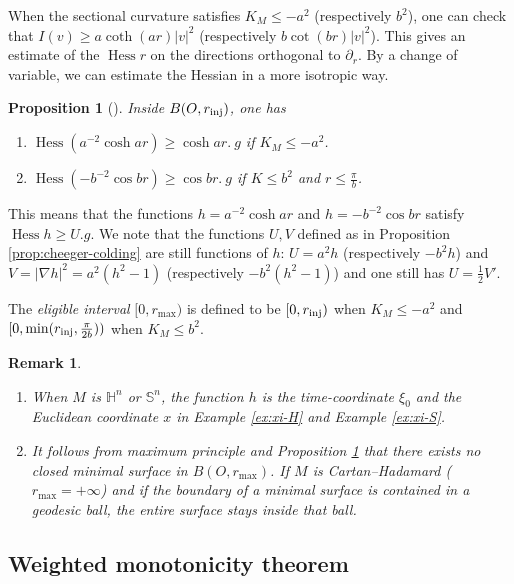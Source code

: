 \documentclass[11pt]{article}
\newtheorem{remark}[theorem]{Remark}
\newtheorem{proposition}[theorem]{Proposition}
\DeclareMathOperator{\hess}{Hess}
\begin{document}
When the sectional curvature
satisfies \(K_M\leq -a^2\) (respectively \(b^2\)), one can check that
\(I(v) \geq a\coth(ar)|v|^2\) (respectively \(b\cot (br)|v|^2\)). This gives an estimate of the \(\hess r\) on the
directions orthogonal to \(\partial_r\). By a change of variable, we can estimate the Hessian in a more isotropic way. 

\begin{proposition}[]
\label{prop:hess-r}
Inside \(B(O,r_{\rm inj})\), one has
\begin{enumerate}
\item \(\hess (a^{-2}\cosh ar) \geq \cosh ar.\ g\) if \(K_M\leq -a^2\).
\item \(\hess (-b^{-2}\cos br) \geq \cos br.\ g\) if \(K\leq b^2\) and \(r\leq \frac{\pi}{b}\).
\end{enumerate}
\end{proposition}
This means that the functions \(h=a^{-2}\cosh ar\) and \(h=-b^{-2}\cos br\) satisfy \(\hess h \geq
U.g\). 
We note that the functions \(U, V\) defined as in Proposition \ref{prop:cheeger-colding}
are still functions of \(h\): \(U= a^2 h\) (respectively \(-b^2 h\)) and \(V = |\nabla h|^2 = a^2
(h^2-1)\) (respectively \(-b^2 (h^2-1)\)) and one still has \(U = \frac{1}{2}V'\).

The \emph{eligible interval} \([0,r_{ \max})\) is defined to be \([0, r_{\rm inj})\) when
\(K_M\leq -a^2\) and \([0, \min (r_{\rm inj}, \frac{\pi}{2b}))\) when \(K_M\leq b^2\).

\begin{remark}
\label{rem:no-min-K}
\begin{enumerate}
\item When \(M\) is \(\mathbb{H}^n\) or \(\mathbb{S}^n\), the function \(h\) is the time-coordinate \(\xi_0\) and
the Euclidean coordinate \(x\) in Example \ref{ex:xi-H} and Example \ref{ex:xi-S}.
\item It follows from maximum principle and Proposition \ref{prop:hess-r} that there exists no closed
minimal surface in \(B(O, r_{\max})\). If \(M\) is Cartan--Hadamard (\(r_{\max}=+\infty\)) and if the boundary of a
minimal surface is contained in a geodesic ball, the entire surface stays inside that ball.
\end{enumerate}
\end{remark}

\subsection{Weighted monotonicity theorem}
\label{sec:orgd241377}
\end{document}
